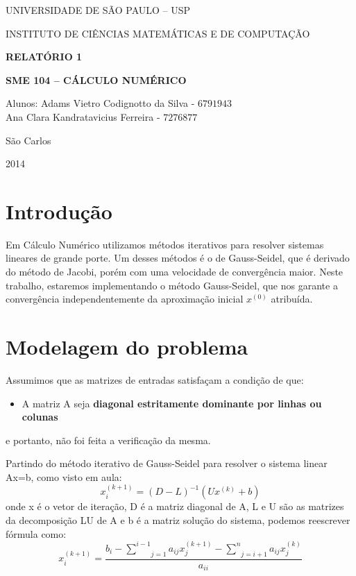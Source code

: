 \documentclass[10pt,a4paper]{article}
\begin{document}
\thispagestyle{empty}
\begin{center}
	UNIVERSIDADE DE SÃO PAULO – USP
	
	INSTITUTO DE CIÊNCIAS MATEMÁTICAS E DE COMPUTAÇÃO
	
	
	
	\vspace{7cm}
	
	\Large{\textbf{RELATÓRIO 1}}
	 
	\Large{\textbf{SME 104 – CÁLCULO NUMÉRICO}}
	
	\vspace{6cm}
	
	Alunos: Adams Vietro Codignotto da Silva - $6791943$ \\ Ana Clara Kandratavicius Ferreira - $7276877$
	
	\vspace{6cm}
	
	São Carlos
	
	2014
\end{center}

\newpage

\section*{Introdução}
    Em Cálculo Numérico utilizamos métodos iterativos para resolver sistemas lineares de grande porte. Um desses métodos é o de Gauss-Seidel, que é derivado do método de Jacobi, porém com uma velocidade de convergência maior. Neste trabalho, estaremos implementando o método Gauss-Seidel, que nos garante a convergência independentemente da aproximação inicial $x^{(0)}$ atribuída.
\section*{Modelagem do problema}
    Assumimos que as matrizes de entradas satisfaçam a condição de que:
\begin{itemize}
\item A matriz A seja \textbf{diagonal estritamente dominante por linhas ou colunas}
\end{itemize}
e portanto, não foi feita a verificação da mesma.
    
    Partindo do método iterativo de Gauss-Seidel para resolver o sistema linear Ax=b, como visto em aula:
\begin{equation}
\nonumber
x_i^{(k+1)}=(D-L)^{-1}(Ux^{(k)}+b)
\end{equation}
onde x é o vetor de iteração, D é a matriz diagonal de A, L e U são as matrizes da decomposição LU de A e b é a matriz solução do sistema, podemos reescrever fórmula como:
\begin{equation}
\nonumber
x_i^{(k+1)}=\dfrac{b_i-\underset{j=1}{\overset{i-1}\sum}a_{ij}x_j^{(k+1)} - \underset{j=i+1}{\overset{n}\sum}a_{ij}x_j^{(k)}}{a_{ii}}
\end{equation}
\end{document}
